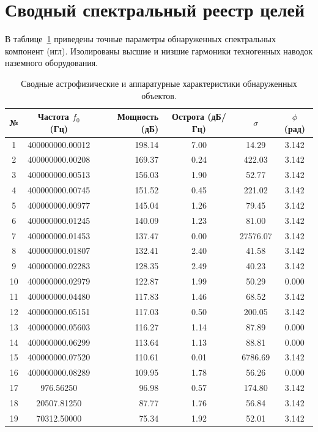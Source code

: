 \documentclass[11pt,twocolumn]{article}
\begin{document}
\section{Сводный спектральный реестр целей}
В таблице~\ref{tab:targets} приведены точные параметры обнаруженных спектральных компонент (игл). 
Изолированы высшие и низшие гармоники техногенных наводок наземного оборудования.\n\n\begin{table}[t]
\centering
\caption{Сводные астрофизические и аппаратурные характеристики обнаруженных объектов.}
\label{tab:targets}
\begin{tabular}{ccrccc}
\toprule
\textbf{№} & \textbf{Частота $f_0$ (Гц)} & \textbf{Мощность (дБ)} & \textbf{Острота (дБ/Гц)} & $\sigma$ & $\phi$ (рад) \\
\midrule
  1 & 400000000.00012 & 198.14 & 7.00 & 14.29 & 3.142 \\
  2 & 400000000.00208 & 169.37 & 0.24 & 422.03 & 3.142 \\
  3 & 400000000.00513 & 156.03 & 1.90 & 52.77 & 3.142 \\
  4 & 400000000.00745 & 151.52 & 0.45 & 221.02 & 3.142 \\
  5 & 400000000.00977 & 145.04 & 1.26 & 79.45 & 3.142 \\
  6 & 400000000.01245 & 140.09 & 1.23 & 81.00 & 3.142 \\
  7 & 400000000.01453 & 137.47 & 0.00 & 27576.07 & 3.142 \\
  8 & 400000000.01807 & 132.41 & 2.40 & 41.58 & 3.142 \\
  9 & 400000000.02283 & 128.35 & 2.49 & 40.23 & 3.142 \\
  10 & 400000000.02979 & 122.87 & 1.99 & 50.29 & 0.000 \\
  11 & 400000000.04480 & 117.83 & 1.46 & 68.52 & 3.142 \\
  12 & 400000000.05151 & 117.03 & 0.50 & 200.05 & 3.142 \\
  13 & 400000000.05603 & 116.27 & 1.14 & 87.89 & 0.000 \\
  14 & 400000000.06299 & 113.64 & 1.13 & 88.81 & 0.000 \\
  15 & 400000000.07520 & 110.61 & 0.01 & 6786.69 & 3.142 \\
  16 & 400000000.08289 & 109.95 & 1.78 & 56.26 & 0.000 \\
  17 & 976.56250 & 96.98 & 0.57 & 174.80 & 3.142 \\
  18 & 20507.81250 & 87.77 & 1.76 & 56.84 & 3.142 \\
  19 & 70312.50000 & 75.34 & 1.92 & 52.01 & 3.142 \\

\end{tabular}
\end{table}
\end{document}
